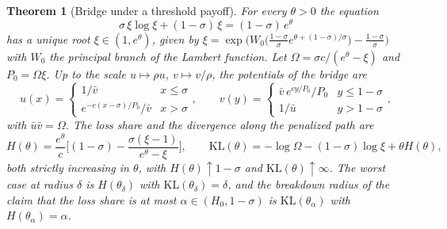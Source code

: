 \documentclass[11pt,a4paper]{article}
\theoremstyle{notesplain}
\newtheorem{theorem}{Theorem}[section]
\theoremstyle{notesupright}
\numberwithin{equation}{section}
\newcommand{\KL}{\mathrm{KL}}
\begin{document}
\begin{theorem}[Bridge under a threshold payoff]
\label{thm:bridge}
For every $\theta>0$ the equation
\begin{equation}
\sigma\,\xi\log\xi+(1-\sigma)\,\xi=(1-\sigma)\,e^\theta
\label{eq:xi}
\end{equation}
has a unique root $\xi\in(1,e^\theta)$, given by $\xi=\exp\big(W_0\big(\tfrac{1-\sigma}{\sigma}e^{\theta+(1-\sigma)/\sigma}\big)-\tfrac{1-\sigma}{\sigma}\big)$ with $W_0$ the principal branch of the Lambert function. Let $\Omega=\sigma c/(e^\theta-\xi)$ and $P_0=\Omega\xi$. Up to the scale $u\mapsto\rho u$, $v\mapsto v/\rho$, the potentials of the bridge are
\begin{equation}
u(x)=\begin{cases}1/\bar v & x\le\sigma\\ e^{-c(x-\sigma)/P_0}/\bar v & x>\sigma\end{cases},\qquad
v(y)=\begin{cases}\bar v\,e^{cy/P_0}/P_0 & y\le1-\sigma\\ 1/\bar u & y>1-\sigma\end{cases},
\label{eq:potentials}
\end{equation}
with $\bar u\bar v=\Omega$. The loss share and the divergence along the penalized path are
\begin{equation}
H(\theta)=\frac{e^\theta}{c}\Big[(1-\sigma)-\frac{\sigma(\xi-1)}{e^\theta-\xi}\Big],\qquad
\KL(\theta)=-\log\Omega-(1-\sigma)\log\xi+\theta H(\theta),
\label{eq:HKL}
\end{equation}
both strictly increasing in $\theta$, with $H(\theta)\uparrow1-\sigma$ and $\KL(\theta)\uparrow\infty$. The worst case at radius $\delta$ is $H(\theta_\delta)$ with $\KL(\theta_\delta)=\delta$, and the breakdown radius of the claim that the loss share is at most $\alpha\in(H_0,1-\sigma)$ is $\KL(\theta_\alpha)$ with $H(\theta_\alpha)=\alpha$.
\end{theorem}
\end{document}
